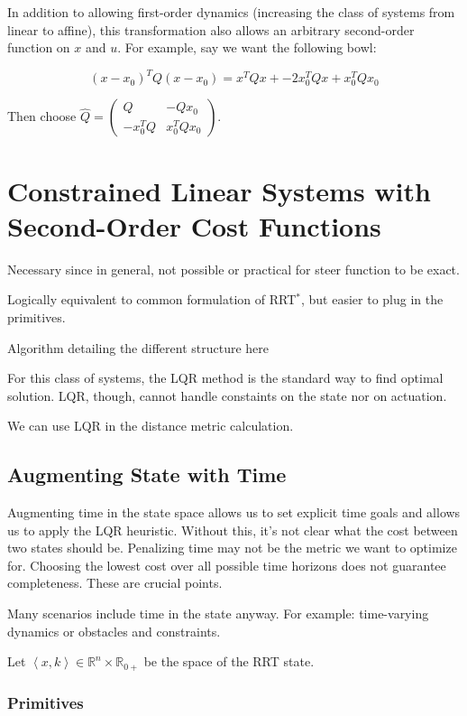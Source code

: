 \documentclass[letterpaper, 10pt, english, conference]{IEEEtran}
\begin{document}
In addition to allowing first-order dynamics (increasing the class
of systems from linear to affine), this transformation also allows
an arbitrary second-order function on $x$ and $u$. For example,
say we want the following bowl:

\[
\left(x-x_{0}\right)^{T}Q\left(x-x_{0}\right)=x^{T}Qx+-2x_{0}^{T}Qx+x_{0}^{T}Qx_{0}
\]


Then choose $\hat{Q}=\left(\begin{array}{cc}
Q & -Qx_{0}\\
-x_{0}^{T}Q & x_{0}^{T}Qx_{0}
\end{array}\right)$.


\section{Constrained Linear Systems with Second-Order Cost Functions}

Necessary since in general, not possible or practical for steer function
to be exact. 

Logically equivalent to common formulation of RRT$^*$, but easier to
plug in the primitives.

Algorithm detailing the different structure here 

For this class of systems, the LQR method is the standard way to find
optimal solution. LQR, though, cannot handle constaints on the state
nor on actuation.

We can use LQR in the distance metric calculation.


\subsection{Augmenting State with Time}

Augmenting time in the \rrtstar state space allows us to set explicit
time goals and allows us to apply the LQR heuristic. Without this,
it's not clear what the cost between two states should be. Penalizing
time may not be the metric we want to optimize for. Choosing the lowest
cost over all possible time horizons does not guarantee completeness.
These are crucial points.

Many scenarios include time in the state anyway. For example: time-varying
dynamics or obstacles and constraints. 

Let $\left\langle x,k\right\rangle \in\mathbb{R}^{n}\times\mathbb{R}_{0+}$
be the space of the RRT state.


\subsubsection{Primitives}
\end{document}
